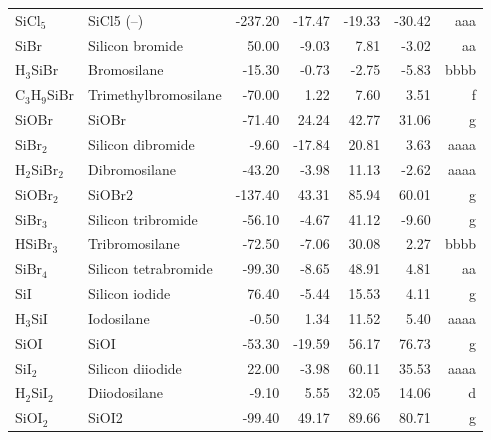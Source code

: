 \begin{table}
\begin{center}
\begin{tabular}{llrrrrr}
 SiCl$_5$       & SiCl5 (--)                              &  -237.20    &   -17.47  &   -19.33  &   -30.42  &    aaa\\
 SiBr        & Silicon bromide                        &    50.00    &    -9.03  &     7.81  &    -3.02  &     aa\\
 H$_3$SiBr      & Bromosilane                            &   -15.30    &    -0.73  &    -2.75  &    -5.83  &   bbbb\\
 C$_3$H$_9$SiBr    & Trimethylbromosilane                   &   -70.00    &     1.22  &     7.60  &     3.51  &      f\\
 SiOBr       & SiOBr                                  &   -71.40    &    24.24  &    42.77  &    31.06  &      g\\
 SiBr$_2$       & Silicon dibromide                      &    -9.60    &   -17.84  &    20.81  &     3.63  &   aaaa\\
 H$_2$SiBr$_2$     & Dibromosilane                          &   -43.20    &    -3.98  &    11.13  &    -2.62  &   aaaa\\
 SiOBr$_2$      & SiOBr2                                 &  -137.40    &    43.31  &    85.94  &    60.01  &      g\\
 SiBr$_3$       & Silicon tribromide                     &   -56.10    &    -4.67  &    41.12  &    -9.60  &      g\\
 HSiBr$_3$      & Tribromosilane                         &   -72.50    &    -7.06  &    30.08  &     2.27  &   bbbb\\
 SiBr$_4$       & Silicon tetrabromide                   &   -99.30    &    -8.65  &    48.91  &     4.81  &     aa\\
 SiI         & Silicon iodide                         &    76.40    &    -5.44  &    15.53  &     4.11  &      g\\
 H$_3$SiI       & Iodosilane                             &    -0.50    &     1.34  &    11.52  &     5.40  &   aaaa\\
 SiOI        & SiOI                                   &   -53.30    &   -19.59  &    56.17  &    76.73  &      g\\
 SiI$_2$        & Silicon diiodide                       &    22.00    &    -3.98  &    60.11  &    35.53  &   aaaa\\
 H$_2$SiI$_2$      & Diiodosilane                           &    -9.10    &     5.55  &    32.05  &    14.06  &      d\\
 SiOI$_2$       & SiOI2                                  &   -99.40    &    49.17  &    89.66  &    80.71  &      g\\

\end{tabular}
\end{center}
\end{table}
